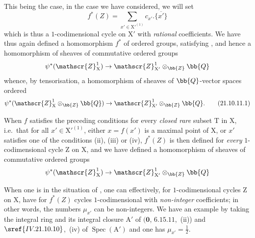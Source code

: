 \begin{env}[21.10.11]
This being the case, in the case we have considered, we will set
\[
  f^*(Z)=\sum_{x'\in\mathrm{X}'^{(1)}} c_{x'}.\overline{\{x'\}}
\]
which is thus a $1$-codimensional cycle on $\mathrm{X}'$ with \emph{rational} coefficients.
We have thus again defined a homomorphism $f^*$ of ordered groups, satisfying , and hence a homomorphism of sheaves of commutative ordered groups
\[
  \psi^*(\mathscr{Z}^1_{\mathrm{X}})\to\mathscr{Z}^1_{\mathrm{X}'}\otimes_{\bb{Z}}\bb{Q}
\]
whence, by tensorisation, a homomorphism of sheaves of $\bb{Q}$-vector spaces ordered
\[
\label{IV.21.10.11.1}
  \psi^*(\mathscr{Z}^1_{\mathrm{X}}\otimes_{\bb{Z}}\bb{Q})\to\mathscr{Z}^1_{\mathrm{X}'}\otimes_{\bb{Z}}\bb{Q}.
  \tag{21.10.11.1}
\]

When $f$ satisfies the preceding conditions for every \emph{closed rare} subset $\mathrm{T}$ in $\mathrm{X}$, i.e.\ that for all $x'\in\mathrm{X}'^{(1)}$, either $x=f(x')$ is a maximal point of $\mathrm{X}$, or $x'$ satisfies one of the conditions (ii), (iii) or (iv), $f^*(Z)$ is then defined for \emph{every} $1$-codimensional cycle $\mathrm{Z}$ on $\mathrm{X}$, and we have defined a homomorphism of sheaves of commutative ordered groups
\[
  \psi^*(\mathscr{Z}^1_{\mathrm{X}})\to\mathscr{Z}^1_{\mathrm{X}'}\otimes_{\bb{Z}}\bb{Q}
\]
\end{env}

\begin{remark}[21.10.12]
\label{IV.21.10.12}
When one is in the situation of , one can effectively, for $1$-codimensional cycles $\mathrm{Z}$ on $\mathrm{X}$, have for $f^*(Z)$ cycles $1$-codimensional with \emph{non-integer} coefficients; in other words, the numbers $\mu_{x'}$ can be non-integers.
We have an example by taking the integral ring and its integral closure $\mathrm{A}'$ of $(\mathbf{0}$, $6.15.11$,~(ii)) and $\sref{IV.21.10.10}$,~(iv) of $\operatorname{Spec}(\mathrm{A}')$ and one has $\mu_{x'}=\frac{1}{2}$.
\end{remark}

